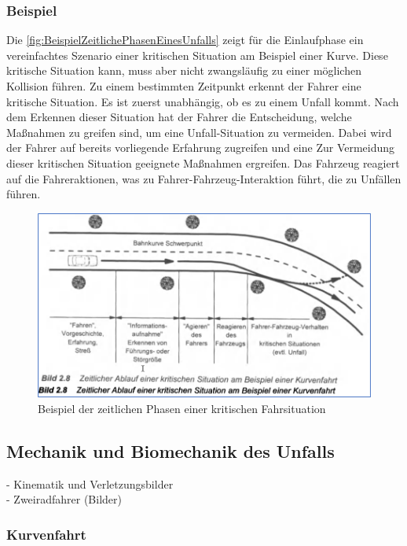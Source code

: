 \subsubsection{Beispiel}

Die \autoref{fig:BeispielZeitlichePhasenEinesUnfalls} zeigt für die Einlaufphase ein vereinfachtes Szenario einer kritischen Situation am Beispiel einer Kurve. Diese kritische Situation kann, muss aber nicht zwangsläufig zu einer möglichen Kollision führen. Zu einem bestimmten Zeitpunkt erkennt der Fahrer eine kritische Situation. Es ist zuerst unabhängig, ob es zu einem Unfall kommt. Nach dem Erkennen dieser Situation hat der Fahrer die Entscheidung, welche Maßnahmen zu greifen sind, um eine Unfall-Situation zu vermeiden. Dabei wird der Fahrer auf bereits vorliegende Erfahrung zugreifen und eine Zur Vermeidung dieser kritischen Situation geeignete Maßnahmen ergreifen. Das Fahrzeug reagiert auf die Fahreraktionen, was zu Fahrer-Fahrzeug-Interaktion führt, die zu Unfällen führen.\cite{Appel2002}\\


\begin{figure}[H]
	\centering
	\includegraphics[width=\linewidth]{Bilder/BeispielZeitlichePhasenEinesUnfalls.png}
	\caption{Beispiel der zeitlichen Phasen einer kritischen Fahrsituation \cite{Appel2002}}
	\label{fig:BeispielZeitlichePhasenEinesUnfalls}
\end{figure}

%
%
%
%
%
\subsection{Mechanik und Biomechanik des Unfalls}
- Kinematik und Verletzungsbilder\\
- Zweiradfahrer (Bilder)

\subsubsection{Kurvenfahrt} \cite{Haedrich2012} 

